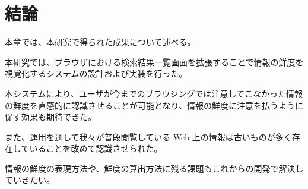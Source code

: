\chapter{結論}
\label{chap:conclusion}

本章では、本研究で得られた成果について述べる。

\newpage

本研究では、ブラウザにおける検索結果一覧画面を拡張することで情報の鮮度を視覚化するシステムの設計および実装を行った。

本システムにより、ユーザが今までのブラウジングでは注意してこなかった情報の鮮度を直感的に認識させることが可能となり、情報の鮮度に注意を払うように促す効果も期待できた。

また、運用を通して我々が普段閲覧している Web 上の情報は古いものが多く存在していることを改めて認識させられた。

情報の鮮度の表現方法や、鮮度の算出方法に残る課題もこれからの開発で解決していきたい。
